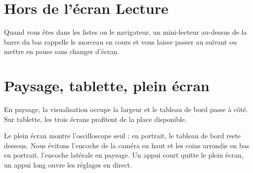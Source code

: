 \section{Hors de l'écran Lecture}
Quand vous êtes dans les listes ou le navigateur, un mini-lecteur au-dessus de la barre du bas rappelle le morceau en
cours et vous laisse passer au suivant ou mettre en pause sans changer d'écran.

\section{Paysage, tablette, plein écran}
En paysage, la visualisation occupe la largeur et le tableau de bord passe à côté. Sur tablette, les trois écrans
profitent de la place disponible.


Le plein écran montre l'oscilloscope seul ; en portrait, le tableau de bord reste dessous. Nous évitons l'encoche de
la caméra en haut et les coins arrondis en bas en portrait, l'encoche latérale en paysage. Un appui court quitte le
plein écran, un appui long ouvre les réglages en direct.
